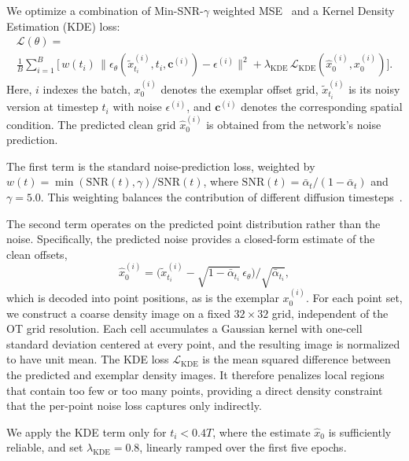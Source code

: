 \documentclass{egpubl}
\begin{document}
We optimize a combination of Min-SNR-$\gamma$ weighted MSE~\cite{hang2024efficientdiffusiontrainingminsnr} and a Kernel Density Estimation (KDE) loss:
\begin{multline*}
\mathcal{L}(\theta) = \\
\frac{1}{B}\sum_{i=1}^{B}\Big[\, w(t_i)\,\big\|\epsilon_\theta(\tilde{x}^{(i)}_{t_i},t_i,\mathbf{c}^{(i)})-\epsilon^{(i)}\big\|^2 + \lambda_{\mathrm{KDE}}\,\mathcal{L}_{\mathrm{KDE}}(\hat{x}^{(i)}_{0},x^{(i)}_{0}) \Big].
\end{multline*}
Here, $i$ indexes the batch, $x^{(i)}_0$ denotes the exemplar offset grid, $\tilde{x}^{(i)}_{t_i}$ is its noisy version at timestep $t_i$ with noise $\epsilon^{(i)}$, and $\mathbf{c}^{(i)}$ denotes the corresponding spatial condition. The predicted clean grid $\hat{x}^{(i)}_0$ is obtained from the network's noise prediction.


The first term is the standard noise-prediction loss, weighted by
$w(t)=\min(\mathrm{SNR}(t),\gamma)/\mathrm{SNR}(t)$, where $\mathrm{SNR}(t)=\bar{\alpha}_{t}/(1-\bar{\alpha}_{t})$ and $\gamma=5.0$. This weighting balances the contribution of different diffusion timesteps~\cite{hang2024efficientdiffusiontrainingminsnr}.

The second term operates on the predicted point distribution rather than the noise. Specifically, the predicted noise provides a closed-form estimate of the clean offsets,
$$
\hat{x}^{(i)}_0=\big(\tilde{x}^{(i)}_{t_i}-\sqrt{1-\bar{\alpha}_{t_i}}\,\epsilon_\theta\big)/\sqrt{\bar{\alpha}_{t_i}}, 
$$
which is decoded into point positions, as is the exemplar $x^{(i)}_0$. For each point set, we construct a coarse density image on a fixed $32\times32$ grid, independent of the OT grid resolution. Each cell accumulates a Gaussian kernel with one-cell standard deviation centered at every point, and the resulting image is normalized to have unit mean. The KDE loss $\mathcal{L}_{\mathrm{KDE}}$ is the mean squared difference between the predicted and exemplar density images. It therefore penalizes local regions that contain too few or too many points, providing a direct density constraint that the per-point noise loss captures only indirectly.

We apply the KDE term only for $t_i<0.4T$, where the estimate $\hat{x}_0$ is sufficiently reliable, and set $\lambda_{\mathrm{KDE}}=0.8$, linearly ramped over the first five epochs.
\end{document}

